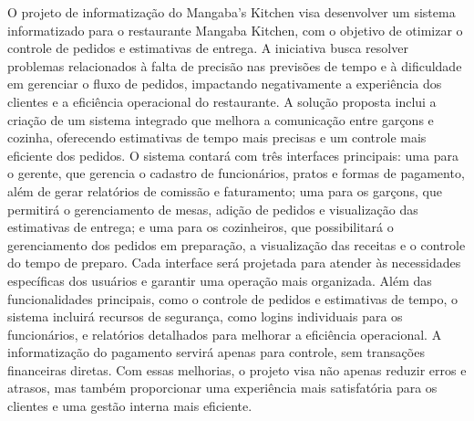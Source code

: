 \hspace{4.5mm}
O projeto de informatização do Mangaba's Kitchen visa desenvolver um sistema informatizado para o restaurante Mangaba Kitchen, com o objetivo de otimizar o controle de pedidos e estimativas de entrega. A iniciativa busca resolver problemas relacionados à falta de precisão nas previsões de tempo e à dificuldade em gerenciar o fluxo de pedidos, impactando negativamente a experiência dos clientes e a eficiência operacional do restaurante. A solução proposta inclui a criação de um sistema integrado que melhora a comunicação entre garçons e cozinha, oferecendo estimativas de tempo mais precisas e um controle mais eficiente dos pedidos.
O sistema contará com três interfaces principais: uma para o gerente, que gerencia o cadastro de funcionários, pratos e formas de pagamento, além de gerar relatórios de comissão e faturamento; uma para os garçons, que permitirá o gerenciamento de mesas, adição de pedidos e visualização das estimativas de entrega; e uma para os cozinheiros, que possibilitará o gerenciamento dos pedidos em preparação, a visualização das receitas e o controle do tempo de preparo. Cada interface será projetada para atender às necessidades específicas dos usuários e garantir uma operação mais organizada.
Além das funcionalidades principais, como o controle de pedidos e estimativas de tempo, o sistema incluirá recursos de segurança, como logins individuais para os funcionários, e relatórios detalhados para melhorar a eficiência operacional. A informatização do pagamento servirá apenas para controle, sem transações financeiras diretas. Com essas melhorias, o projeto visa não apenas reduzir erros e atrasos, mas também proporcionar uma experiência mais satisfatória para os clientes e uma gestão interna mais eficiente.